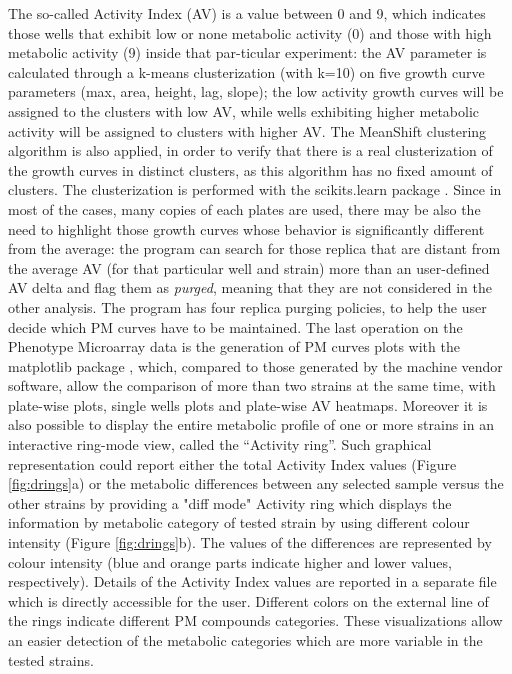 The so-called Activity Index (AV) is a value between 0 and 9, which indicates those wells that exhibit low or none metabolic activity (0) and those with high metabolic activity (9) inside that par-ticular experiment: the AV parameter is calculated through a k-means clusterization (with k=10) on five growth curve parameters (max, area, height, lag, slope); the low activity growth curves will be assigned to the clusters with low AV, while wells exhibiting higher metabolic activity will be assigned to clusters with higher AV. The MeanShift clustering algorithm is also applied, in order to verify that there is a real clusterization of the growth curves in distinct clusters, as this algorithm has no fixed amount of clusters. The clusterization is performed with the scikits.learn package \cite{pedregosa2011scikit}. Since in most of the cases, many copies of each plates are used, there may be also the need to highlight those growth curves whose behavior is significantly different from the average: the program can search for those replica that are distant from the average AV (for that particular well and strain) more than an user-defined AV delta and flag them as \textit{purged}, meaning that they are not considered in the other analysis. The program has four replica purging policies, to help the user decide which PM curves have to be maintained. The last operation on the Phenotype Microarray data is the generation of PM curves plots with the matplotlib package \cite{hunter2007matplotlib}, which, compared to those generated by the machine vendor software, allow the comparison of more than two strains at the same time, with plate-wise plots, single wells plots and plate-wise AV heatmaps. Moreover it is also possible to display the entire metabolic profile of one or more strains in an interactive ring-mode view, called the “Activity ring”. Such graphical representation could report either the total Activity Index values (Figure \ref{fig:drings}a) or the metabolic differences between any selected sample versus the other strains by providing a "diff mode" Activity ring which displays the information by metabolic category of tested strain by using different colour intensity (Figure \ref{fig:drings}b). The values of the differences are represented by colour intensity (blue and orange parts indicate higher and lower values, respectively). Details of the Activity Index values are reported in a separate file which is directly accessible for the user. Different colors on the external line of the rings indicate different PM compounds categories. These visualizations allow an easier detection of the metabolic categories which are more variable in the tested strains. 

